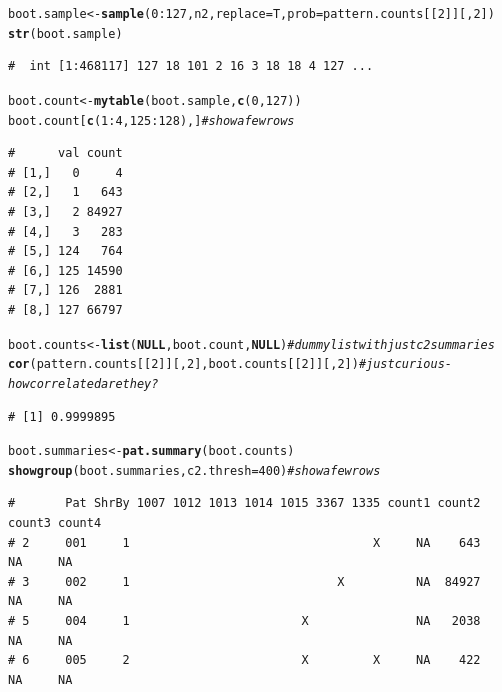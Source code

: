 \documentclass{article}\usepackage[]{graphicx}\usepackage[]{color}
\makeatletter
\newcommand{\hlnum}[1]{\textcolor[rgb]{0.686,0.059,0.569}{#1}}%
\newcommand{\hlcom}[1]{\textcolor[rgb]{0.678,0.584,0.686}{\textit{#1}}}%
\newcommand{\hlopt}[1]{\textcolor[rgb]{0,0,0}{#1}}%
\newcommand{\hlstd}[1]{\textcolor[rgb]{0.345,0.345,0.345}{#1}}%
\newcommand{\hlkwa}[1]{\textcolor[rgb]{0.161,0.373,0.58}{\textbf{#1}}}%
\newcommand{\hlkwb}[1]{\textcolor[rgb]{0.69,0.353,0.396}{#1}}%
\newcommand{\hlkwc}[1]{\textcolor[rgb]{0.333,0.667,0.333}{#1}}%
\newcommand{\hlkwd}[1]{\textcolor[rgb]{0.737,0.353,0.396}{\textbf{#1}}}%
\newenvironment{kframe}{%
 \def\at@end@of@kframe{}%
 \ifinner\ifhmode%
  \def\at@end@of@kframe{\end{minipage}}%
  \begin{minipage}{\columnwidth}%
 \fi\fi%
 \def\FrameCommand##1{\hskip\@totalleftmargin \hskip-\fboxsep
 \colorbox{shadecolor}{##1}\hskip-\fboxsep
     \hskip-\linewidth \hskip-\@totalleftmargin \hskip\columnwidth}%
 \MakeFramed {\advance\hsize-\width
   \@totalleftmargin\z@ \linewidth\hsize
   \@setminipage}}%
 {\par\unskip\endMakeFramed%
 \at@end@of@kframe}
\newenvironment{knitrout}{}{} %
\makeatother
\begin{document}
\begin{knitrout}\footnotesize
{}\color{fgcolor}\begin{kframe}
\begin{alltt}
\hlstd{boot.sample} \hlkwb{<-} \hlkwd{sample}\hlstd{(}\hlnum{0}\hlopt{:}\hlnum{127}\hlstd{,n2,}\hlkwc{replace}\hlstd{=T,}\hlkwc{prob}\hlstd{=pattern.counts[[}\hlnum{2}\hlstd{]][,}\hlnum{2}\hlstd{])}
\hlkwd{str}\hlstd{(boot.sample)}
\end{alltt}
\begin{verbatim}
#  int [1:468117] 127 18 101 2 16 3 18 18 4 127 ...
\end{verbatim}
\begin{alltt}
\hlstd{boot.count} \hlkwb{<-} \hlkwd{mytable}\hlstd{(boot.sample,}\hlkwd{c}\hlstd{(}\hlnum{0}\hlstd{,}\hlnum{127}\hlstd{))}
\hlstd{boot.count[}\hlkwd{c}\hlstd{(}\hlnum{1}\hlopt{:}\hlnum{4}\hlstd{,}\hlnum{125}\hlopt{:}\hlnum{128}\hlstd{),]} \hlcom{# show a few rows}
\end{alltt}
\begin{verbatim}
#      val count
# [1,]   0     4
# [2,]   1   643
# [3,]   2 84927
# [4,]   3   283
# [5,] 124   764
# [6,] 125 14590
# [7,] 126  2881
# [8,] 127 66797
\end{verbatim}
\begin{alltt}
\hlstd{boot.counts} \hlkwb{<-} \hlkwd{list}\hlstd{(}\hlkwa{NULL}\hlstd{,boot.count,}\hlkwa{NULL}\hlstd{)} \hlcom{# dummy list with just c2 summaries}
\hlkwd{cor}\hlstd{(pattern.counts[[}\hlnum{2}\hlstd{]][,}\hlnum{2}\hlstd{],boot.counts[[}\hlnum{2}\hlstd{]][,}\hlnum{2}\hlstd{])} \hlcom{# just curious - how correlated are they?}
\end{alltt}
\begin{verbatim}
# [1] 0.9999895
\end{verbatim}
\begin{alltt}
\hlstd{boot.summaries} \hlkwb{<-} \hlkwd{pat.summary}\hlstd{(boot.counts)}
\hlkwd{showgroup}\hlstd{(boot.summaries,}\hlkwc{c2.thresh}\hlstd{=}\hlnum{400}\hlstd{)} \hlcom{#show a few rows}
\end{alltt}
\begin{verbatim}
#       Pat ShrBy 1007 1012 1013 1014 1015 3367 1335 count1 count2 count3 count4
# 2     001     1                                  X     NA    643     NA     NA
# 3     002     1                             X          NA  84927     NA     NA
# 5     004     1                        X               NA   2038     NA     NA
# 6     005     2                        X         X     NA    422     NA     NA

\end{verbatim}
\end{kframe}
\end{knitrout}
\end{document}
